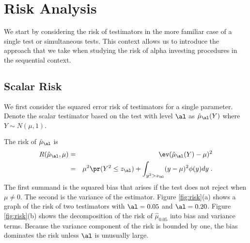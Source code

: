 \documentclass[12pt]{article}
\begin{document}
\section{ Risk Analysis}

We start by considering the risk of testimators in the more familiar case of a
single test or simultaneous tests.  This context allows us to introduce the
approach that we take when studying the risk of alpha investing procedures in
the sequential context.



\subsection{ Scalar Risk }

We first consider the squared error risk of testimators for a single parameter.
  Denote the scalar testimator based on the test with level $\al$ as
 $\hat\mu_\al(Y)$ where $Y \sim N(\mu,1)$.

The risk of $\hat\mu_\al$ is
 \begin{eqnarray}
   R(\hat\mu_\al,\mu) 
     &=& \ev(\hat\mu_\al(Y) - \mu)^2  \cr
     &=& \mu^2 \pr(Y^2 \le z_\al) 
         + \int_{y^2>z_\al} (y-\mu)^2 \phi(y) dy \;.
 \label{eq:risk_mu_al}
 \end{eqnarray}
 The first summand is the squared bias that arises if the test does not reject
 when $\mu \ne 0$.  The second is the variance of the estimator.  Figure
 \ref{fig:risk}(a) shows a graph of the risk of two testimators with $\al=0.05$
 and $\al = 0.20$.  Figure \ref{fig:risk}(b) shows the decomposition of the risk
 of $\hat\mu_{0.05}$ into bias and variance terms.  Because the variance
 component of the risk is bounded by one, the bias dominates the risk unless
 $\al$ is unusually large.
\end{document}
